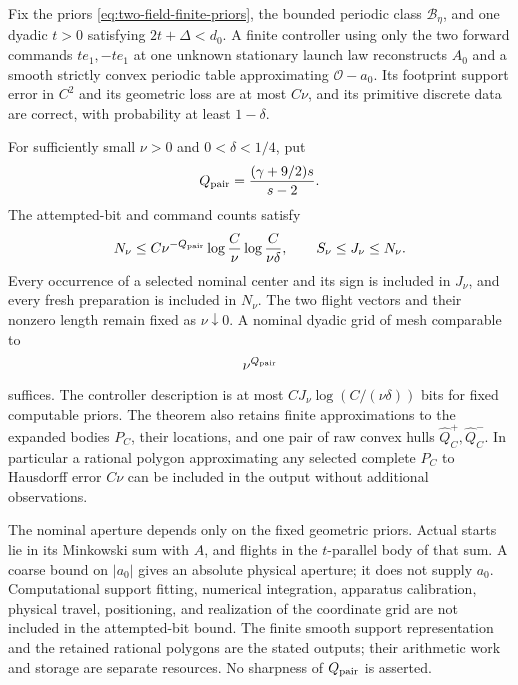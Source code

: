 \begin{theorem}
\label{thm:two-field-finite-geometry}
Fix the priors \eqref{eq:two-field-finite-priors}, the bounded periodic
class $\mathcal B_\eta$, and one dyadic $t>0$ satisfying
$2t+\Delta<d_0$.  A finite controller using only the two forward
commands $te_1,-te_1$ at one unknown stationary launch law reconstructs
$A_0$ and a smooth strictly convex periodic table approximating
$\mathcal O-a_0$.  Its footprint support error in $C^2$ and its
geometric loss are at most $C\nu$, and its primitive discrete data
are correct, with probability at least $1-\delta$.

For sufficiently small $\nu>0$ and $0<\delta<1/4$, put
\begin{equation}\label{eq:two-field-finite-exponent}
                    Q_{\rm pair}=\frac{(\gamma+9/2)s}{s-2}.
\end{equation}
The attempted-bit and command counts satisfy
\begin{equation}\label{eq:two-field-finite-cost}
 N_\nu\le C\nu^{-Q_{\rm pair}}
              \log\frac C\nu\log\frac C{\nu\delta},
                     \qquad S_\nu\le J_\nu\le N_\nu.
\end{equation}
Every occurrence of a selected nominal center and its sign is included
in $J_\nu$, and every fresh preparation is included in $N_\nu$.
The two flight vectors and their nonzero length remain fixed as
$\nu\downarrow0$.  A nominal dyadic grid of mesh comparable to
\begin{equation}\label{eq:two-field-finite-mesh}
                         \nu^{Q_{\rm pair}}
\end{equation}
suffices.  The controller description is at most
$CJ_\nu\log(C/(\nu\delta))$ bits for fixed computable priors.
The theorem also retains finite approximations to the expanded bodies
$P_C$, their locations, and one pair of raw convex hulls
$\widehat Q_C^+,\widehat Q_C^-$.  In particular a rational polygon
approximating any selected complete $P_C$ to Hausdorff error $C\nu$
can be included in the output without additional observations.

The nominal aperture depends only on the fixed geometric priors.
Actual starts lie in its Minkowski sum with $A$, and flights in the
$t$-parallel body of that sum.  A coarse bound on $|a_0|$ gives an
absolute physical aperture; it does not supply $a_0$.  Computational
support fitting, numerical integration, apparatus calibration,
physical travel, positioning, and realization of the coordinate grid
are not included in the attempted-bit bound. The finite smooth support
representation and the retained rational polygons are the stated
outputs; their arithmetic work and storage are separate resources.
No sharpness of
$Q_{\rm pair}$ is asserted.
\end{theorem}
